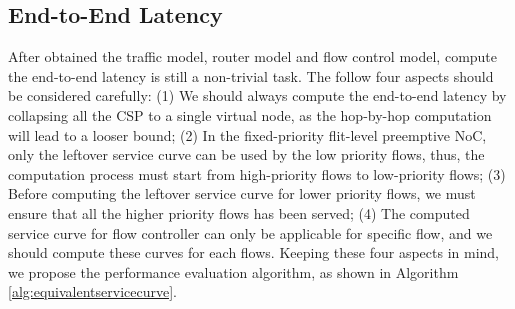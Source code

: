 \documentclass[10pt,journal]{IEEEtran}
\begin{document}
\subsection{End-to-End Latency}\label{e2elatency}
After obtained the traffic model, router model and flow control model, compute the end-to-end latency is still a non-trivial task. The follow four aspects should be considered carefully: (1) We should always compute the end-to-end latency by collapsing all the CSP to a single virtual node, as the hop-by-hop computation will lead to a looser bound; (2) In the fixed-priority flit-level preemptive NoC, only the leftover service curve can be used by the low priority flows, thus, the computation process must start from high-priority flows to low-priority flows; (3) Before computing the leftover service curve for lower priority flows, we must ensure that all the higher priority flows has been served; (4) The computed service curve for flow controller can only be applicable for specific flow, and we should compute these curves for each flows. Keeping these four aspects in mind, we propose the performance evaluation algorithm, as shown in Algorithm \ref{alg:equivalentservicecurve}.
\end{document}
